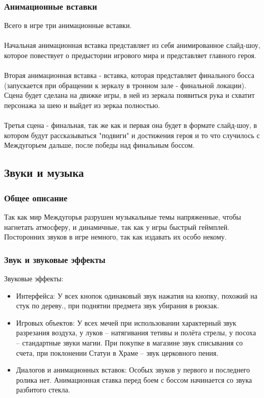 \documentclass{article}
\begin{document}
\subsubsection{Анимационные вставки}
Всего в игре три анимационные вставки.
\\\\
Начальная анимационная вставка представляет из себя анимированное слайд-шоу, которое повествует о предыстории игрового мира и представляет главного героя.
\\\\
Вторая анимационная вставка - вставка, которая представляет финального босса (запускается при обращении к зеркалу в тронном зале - финальной локации). Сцена будет сделана на движке игры, в ней из зеркала появиться рука и схватит персонажа за шею и выйдет из зеркаа полностью.
\\\\
Третья сцена - финальная, так же как и первая она будет в формате слайд-шоу, в котором будут рассказываться "подвиги" и достижения героя и то что случилось с Междугорьем дальше, после победы над финальным боссом.

\subsection{Звуки и музыка}
\subsubsection{Общее описание}
Так как мир Междугорья разрушен музыкальные темы напряженные, чтобы нагнетать атмосферу, и динамичные, так как у игры быстрый геймплей. Посторонних звуков в игре немного, так как издавать их особо некому.

\subsubsection{Звук и звуковые эффекты}
Звуковые эффекты:\begin{itemize}
\item Интерфейса: У всех кнопок одинаковый звук нажатия на кнопку, похожий на стук по дереву., при поднятии предмета звук убирания в рюкзак.
\item Игровых объектов: У всех мечей при использовании характерный звук разрезания воздуха, у луков – натягивания тетивы и полёта стрелы, у посоха – стандартные звуки магии.  При покупке в магазине звук списывания со счета, при поклонении Статуи в Храме – звук церковного пения.
\item Диалогов и анимационных вставок: Особых звуков у первого и последнего ролика нет. Анимационная ставка перед боем с боссом начинается со звука разбитого стекла.
\end{itemize}
\end{document}
